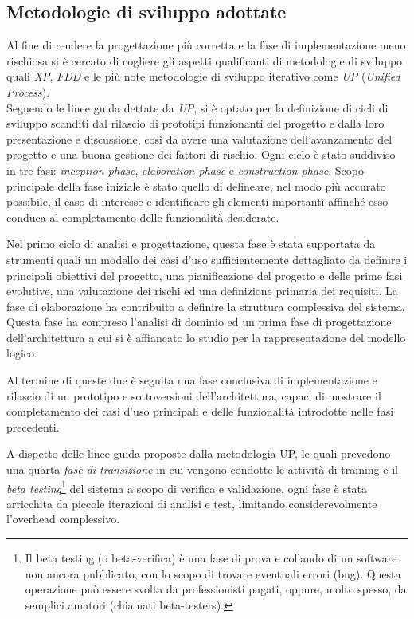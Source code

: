 \subsection{Metodologie di sviluppo adottate}
Al fine di rendere la progettazione più corretta e la fase di implementazione meno rischiosa si è cercato di cogliere gli aspetti qualificanti di metodologie di sviluppo quali \textit{XP}, \textit{FDD} e le più note metodologie di sviluppo iterativo come \textit{UP} (\emph{Unified Process}).\\
Seguendo le linee guida dettate da \textit{UP}, si è optato per la definizione di cicli di sviluppo scanditi dal rilascio di prototipi funzionanti del progetto e dalla loro presentazione e discussione, così da avere una valutazione dell'avanzamento del progetto e una buona gestione dei fattori di rischio. Ogni ciclo è stato suddiviso in tre fasi: \textit{inception phase}, \textit{elaboration phase} e \textit{construction phase}.
Scopo principale della fase iniziale è stato quello di delineare, nel modo più accurato possibile, il caso di interesse e identificare gli elementi importanti affinché esso conduca al completamento delle funzionalità desiderate.

Nel primo ciclo di analisi e progettazione, questa fase è stata supportata da strumenti quali un modello dei casi d'uso sufficientemente dettagliato da definire i principali obiettivi del progetto, una pianificazione del progetto e delle prime fasi evolutive, una valutazione dei rischi ed una definizione primaria dei requisiti.
La fase di elaborazione ha contribuito a definire la struttura complessiva del sistema. Questa fase ha compreso l'analisi di dominio ed un prima fase di progettazione dell'architettura a cui si è affiancato lo studio per la rappresentazione del modello logico.

Al termine di queste due è seguita una fase conclusiva di implementazione e rilascio di un prototipo e sottoversioni dell'architettura, capaci di mostrare il completamento dei casi d'uso principali e delle funzionalità introdotte nelle fasi precedenti.

A dispetto delle linee guida proposte dalla metodologia UP, le quali prevedono una quarta \textit{fase di transizione} in cui vengono condotte le attività di training e il \textit{beta testing}\footnote{Il beta testing (o beta-verifica) è una fase di prova e collaudo di un software non ancora pubblicato, con lo scopo di trovare eventuali errori (bug). Questa operazione può essere svolta da professionisti pagati, oppure, molto spesso, da semplici amatori (chiamati beta-testers).} del sistema a scopo di verifica e validazione, ogni fase è stata arricchita da piccole iterazioni di analisi e test, limitando considerevolmente l'overhead complessivo.


